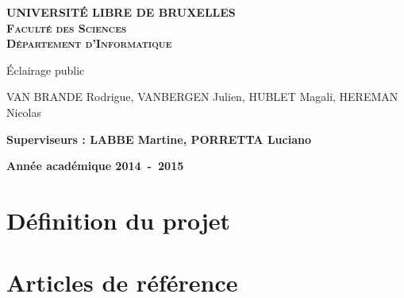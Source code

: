 \documentclass[a4paper,10pt]{report}
\begin{document}
\begin{titlepage}
\begin{center}
\textbf{\textsc{UNIVERSIT\'E LIBRE DE BRUXELLES}}\\
\textbf{\textsc{Facult\'e des Sciences}}\\
\textbf{\textsc{D\'epartement d'Informatique}}
\vfill{}\vfill{}
\begin{center}{\Huge \'Eclairage public}\end{center}{\Huge \par}
\begin{center}{\large VAN BRANDE Rodrigue, VANBERGEN Julien, HUBLET Magali, HEREMAN Nicolas}\end{center}{\Huge \par}
\vfill{}\vfill{}
\begin{flushleft}{\large \textbf{Superviseurs : LABBE Martine, PORRETTA Luciano}}\hfill{}\end{flushleft}{\large\par}
\vfill{}\vfill{}\enlargethispage{3cm}
\textbf{Ann\'ee acad\'emique 2014~-~2015}
\end{center}
\end{titlepage}



\tableofcontents


\chapter{D\'efinition du projet}


\chapter{Articles de r\'ef\'erence}





\end{document}
